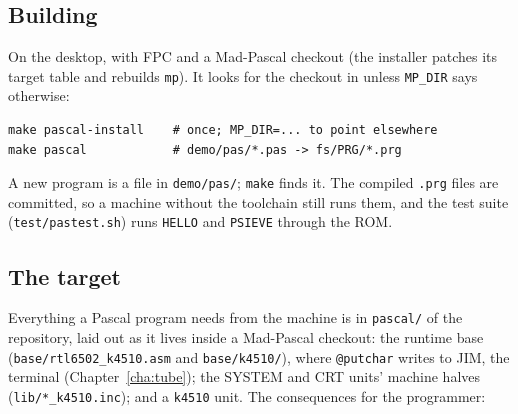 \subsection*{Building}
On the desktop, with FPC and a Mad-Pascal checkout (the installer
patches its target table and rebuilds \texttt{mp}). It looks for the
checkout in  unless
\texttt{MP\_DIR} says otherwise:

\begin{verbatim}
make pascal-install    # once; MP_DIR=... to point elsewhere
make pascal            # demo/pas/*.pas -> fs/PRG/*.prg
\end{verbatim}

A new program is a file in \texttt{demo/pas/}; \texttt{make} finds it.
The compiled \texttt{.prg} files are committed, so a machine without
the toolchain still runs them, and the test suite (\texttt{test/pastest.sh})
runs \verb|HELLO| and \verb|PSIEVE| through the ROM.

\subsection*{The target}
Everything a Pascal program needs from the machine is in
\texttt{pascal/} of the repository, laid out as it lives inside a
Mad-Pascal checkout: the runtime base (\texttt{base/rtl6502\_k4510.asm}
and \texttt{base/k4510/}), where \texttt{@putchar} writes to JIM, the
terminal (Chapter~\ref{cha:tube}); the SYSTEM and CRT units' machine
halves (\texttt{lib/*\_k4510.inc}); and a \texttt{k4510} unit. The
consequences for the programmer:

